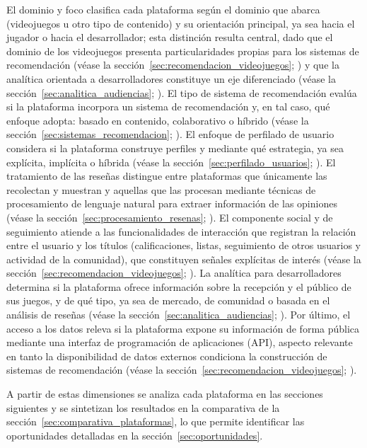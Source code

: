El dominio y foco clasifica cada plataforma según el dominio que abarca (videojuegos u otro tipo de contenido) y su orientación principal, ya sea hacia el jugador o hacia el desarrollador; esta distinción resulta central, dado que el dominio de los videojuegos presenta particularidades propias para los sistemas de recomendación (véase la sección~\ref{sec:recomendacion_videojuegos}; \parencite{CheuqueEtAl2019, ViljanenEtAl2020}) y que la analítica orientada a desarrolladores constituye un eje diferenciado (véase la sección~\ref{sec:analitica_audiencias}; \parencite{DrachenEtAl2011}). El tipo de sistema de recomendación evalúa si la plataforma incorpora un sistema de recomendación y, en tal caso, qué enfoque adopta: basado en contenido, colaborativo o híbrido (véase la sección~\ref{sec:sistemas_recomendacion}; \parencite{KoEtAl2022, ShahEtAl2016}). El enfoque de perfilado de usuario considera si la plataforma construye perfiles y mediante qué estrategia, ya sea explícita, implícita o híbrida (véase la sección~\ref{sec:perfilado_usuarios}; \parencite{KanojeEtAl2014, EkeEtAl2019}). El tratamiento de las reseñas distingue entre plataformas que únicamente las recolectan y muestran y aquellas que las procesan mediante técnicas de procesamiento de lenguaje natural para extraer información de las opiniones (véase la sección~\ref{sec:procesamiento_resenas}; \parencite{ZhangEtAl2022, MedhatEtAl2014}). El componente social y de seguimiento atiende a las funcionalidades de interacción que registran la relación entre el usuario y los títulos (calificaciones, listas, seguimiento de otros usuarios y actividad de la comunidad), que constituyen señales explícitas de interés (véase la sección~\ref{sec:recomendacion_videojuegos}; \parencite{CheuqueEtAl2019, ViljanenEtAl2020}). La analítica para desarrolladores determina si la plataforma ofrece información sobre la recepción y el público de sus juegos, y de qué tipo, ya sea de mercado, de comunidad o basada en el análisis de reseñas (véase la sección~\ref{sec:analitica_audiencias}; \parencite{DrachenEtAl2011, GuzsvineczSzucs2023}). Por último, el acceso a los datos releva si la plataforma expone su información de forma pública mediante una interfaz de programación de aplicaciones (API), aspecto relevante en tanto la disponibilidad de datos externos condiciona la construcción de sistemas de recomendación (véase la sección~\ref{sec:recomendacion_videojuegos}; \parencite{ViljanenEtAl2020}).

A partir de estas dimensiones se analiza cada plataforma en las secciones siguientes y se sintetizan los resultados en la comparativa de la sección~\ref{sec:comparativa_plataformas}, lo que permite identificar las oportunidades detalladas en la sección~\ref{sec:oportunidades}.

